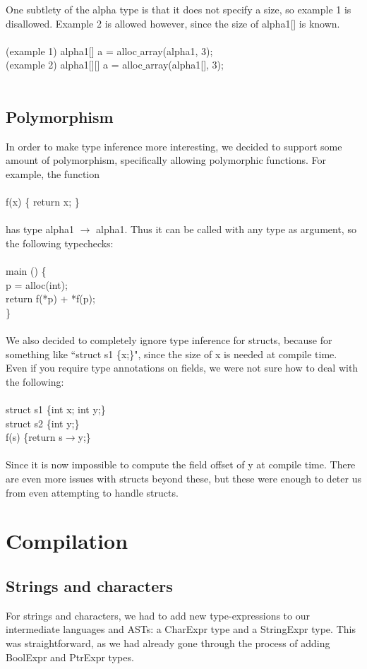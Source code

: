 \documentclass{article}
\begin{document}
One subtlety of the alpha type is that it does not specify a size, so example 1 is disallowed. Example 2 is allowed however, since the size of alpha1[] is known.\\
\\
(example 1) alpha1[] a = alloc$\_$array(alpha1, 3);\\
(example 2) alpha1[][] a = alloc$\_$array(alpha1[], 3);\\
\\

\subsection{Polymorphism}
In order to make type inference more interesting, we decided to support some amount of polymorphism, specifically allowing polymorphic functions. For example, the function\\
\\
f(x) \{ return x; \}\\
\\
has type alpha1 $\to$ alpha1. Thus it can be called with any type as argument, so the following typechecks:\\
\\
main () \{\\
p = alloc(int);\\
return f(*p) + *f(p);\\
\}\\
\\
We also decided to completely ignore type inference for structs, because for something like ``struct s1 \{x;\}", since the size of x is needed at compile time. Even if you require type annotations on fields, we were not sure how to deal with the following:\\
\\
struct s1 \{int x; int y;\}\\
struct s2 \{int y;\}\\
f(s) \{return s$\to$y;\}\\
\\
Since it is now impossible to compute the field offset of y at compile time. There are even more issues with structs beyond these, but these were enough to deter us from even attempting to handle structs.

\section{Compilation}
\subsection{Strings and characters}
For strings and characters, we had to add new type-expressions to our intermediate languages and ASTs: a CharExpr type and a StringExpr type. This was straightforward, as we had already gone through the process of adding BoolExpr and PtrExpr types.
\end{document}
